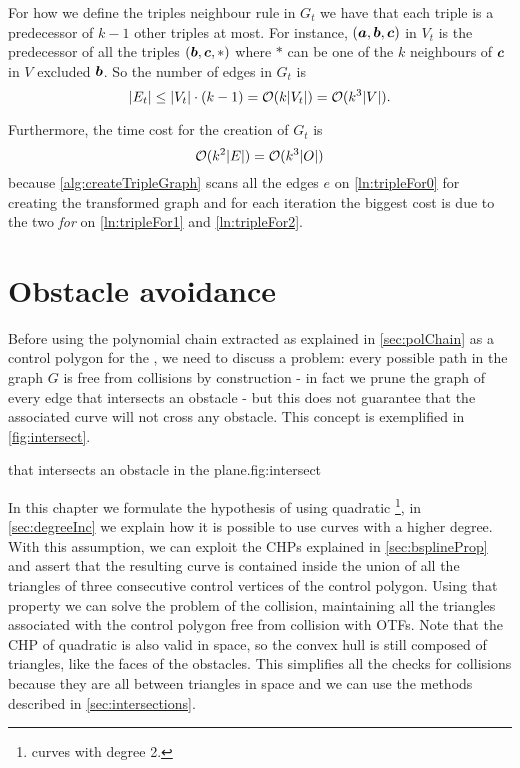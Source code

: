 \documentclass[dissertation.tex]{subfiles}
\begin{document}
For how we define the triples neighbour rule in $G_t$ we have
that each triple is a predecessor of $k-1$ other triples at most. For
instance, $(\boldsymbol{a},\boldsymbol{b},\boldsymbol{c})$ in $V_t$ is the predecessor of all the triples
$(\boldsymbol{b},\boldsymbol{c},*)$ where $*$ can be one of the $k$ neighbours
of $\boldsymbol{c}$ in $V$ excluded $\boldsymbol{b}$. So the number of edges in $G_t$ is
\begin{equation}
  \label{eq:numEdgesTriples}
  |E_t|\leq |V_t|\cdot (k-1)=\mathcal{O}(k|V_t|)=\mathcal{O}(k^3|V|).
\end{equation}

Furthermore, the time cost for the creation of $G_t$ is
\newcommand{\eqCostVt}{\ensuremath{\bigO(k^3|\obsSet|)}}
\begin{equation}
  \label{eq:costVt}
  \bigO(k^2|E|)=\eqCostVt
\end{equation}
because \cref{alg:createTripleGraph} scans all the edges $e$ on
\cref{ln:tripleFor0} for creating the transformed
graph and for each
iteration
the biggest cost is due to the two \emph{for} on \cref{ln:tripleFor1} and
\cref{ln:tripleFor2}.

\section{Obstacle avoidance}\label{sec:obsAvoid}
Before using the polynomial chain extracted as
explained in \cref{sec:polChain} as a control polygon for the
\bs, we need to discuss a
problem: every possible path in the graph $G$ is
free from collisions by construction - in fact we prune the graph of
every edge that intersects an obstacle - but this does not guarantee
that the associated curve will not cross any obstacle. This concept is
exemplified in
\cref{fig:intersect}.
\begin{myfig}{\bs that intersects an obstacle in the plane.}{fig:intersect}
\end{myfig}

In this chapter we formulate the hypothesis of using
quadratic \bss\footnote{\bs curves with degree 2.}, in
\cref{sec:degreeInc} we explain how it is possible to use curves with
a higher degree. With this assumption, we can exploit the \acp{CHP}
explained in \cref{sec:bsplineProp} and assert that the 
resulting curve is contained inside the union of all the triangles of
three consecutive control vertices of the control
polygon. Using that property we can solve the problem of the
collision, maintaining all the triangles associated with the control
polygon free 
from collision with \acp{OTF}. Note that the \ac{CHP} of quadratic
\bss is also valid in space, so the convex hull is still composed
of triangles, like the faces of the
obstacles. This simplifies all the checks for collisions because they
are all between triangles in space and we can use the methods
described in \cref{sec:intersections}.
\end{document}
